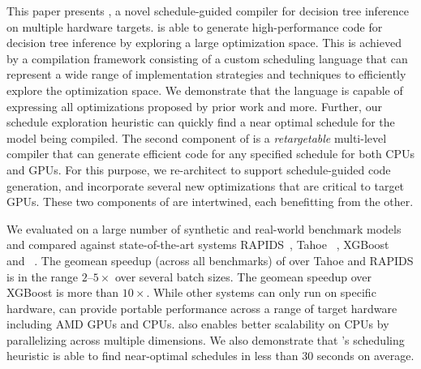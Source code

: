 This paper presents \Treebeard{}, a novel schedule-guided compiler
for decision tree inference on multiple hardware targets. \Treebeard{} is able to 
generate high-performance code for decision tree inference by exploring a large optimization space. 
This is achieved by a compilation framework consisting of a 
custom scheduling language that can represent a wide range of 
implementation strategies and techniques to efficiently explore
the optimization space. We demonstrate that the language is 
capable of expressing all optimizations proposed by prior work and more.
Further, our schedule exploration heuristic can quickly find a near 
optimal schedule for the model being compiled. 
The second component of \Treebeard{} is a \emph{retargetable} multi-level compiler that can generate efficient code 
for any specified schedule for both CPUs and GPUs. For this purpose, we re-architect \TreebeardOLD{} to
support schedule-guided code generation, and incorporate several new optimizations that are critical to target GPUs. 
These two components of \Treebeard{} are intertwined, each benefitting from the other.

We evaluated \Treebeard{} on a large number of synthetic and real-world 
benchmark models and compared against state-of-the-art systems RAPIDS~\cite{RAPIDS}, Tahoe~\cite{Tahoe}
, XGBoost~\cite{XGBoost} and \TreebeardOLD{}~\cite{Treebeard}. 
The geomean speedup (across all benchmarks) of \Treebeard{} over
Tahoe and RAPIDS is in the range $2$--$5\times$ over several batch sizes. The geomean speedup over
XGBoost is more than $10\times$. While other systems can only run on specific hardware,
\Treebeard{} can provide portable performance across a range of target hardware
including AMD GPUs and CPUs. \Treebeard{} also enables better scalability on CPUs by parallelizing 
across multiple dimensions. We also demonstrate that \Treebeard{}'s scheduling heuristic is able to 
find near-optimal schedules in less than 30 seconds on average.

